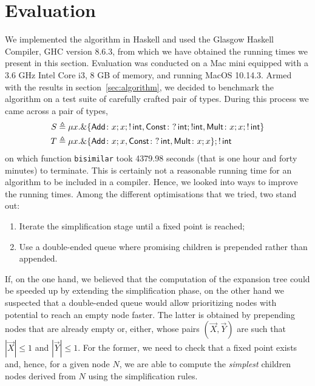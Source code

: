 \section{Evaluation}
\label{sec:evaluation}


We implemented the algorithm
in Haskell and used the Glasgow Haskell Compiler, GHC version 8.6.3,
from which we have obtained the running times we present in this
section.  Evaluation was conducted on a Mac mini equipped with a 3.6
GHz Intel Core i3, 8 GB of memory, and running MacOS 10.14.3.
%
Armed with the results in section~\ref{sec:algorithm}, we decided to
benchmark the algorithm on a test suite of carefully crafted pair of
types. During this process we came across a pair of types,
\begin{equation}
\label{ex:chaotic}
\begin{aligned}
  S &\triangleq \mu x . \&\{ \mathsf{Add}\colon x;x; !\,\mathsf{int},
  \mathsf{Const}\colon ?\,\mathsf{int};!\mathsf{int},
  \mathsf{Mult}\colon x;x;!\,\mathsf{int}\}
  \\
  T &\triangleq \mu x . \&\{ \mathsf{Add}\colon x;x,
  \mathsf{Const}\colon ?\,\mathsf{int},
  \mathsf{Mult}\colon x;x\}; !\,\mathsf{int}
\end{aligned}
\end{equation}
%
on which function \lstinline|bisimilar| took 4379.98 seconds (that is
one hour and forty minutes) to terminate. This is certainly not a
reasonable running time for an algorithm to be included in a
compiler. Hence, we looked into ways to improve the running
times. Among the different optimisations that we tried, two stand
out:
\begin{enumerate}
\item Iterate the simplification stage until a fixed point is reached;
\item Use a double-ended queue where promising children is prepended
  rather than appended.
\end{enumerate}

If, on the one hand, we believed that the computation of the expansion
tree could be speeded up by extending the simplification phase, on the
other hand we suspected that a double-ended queue would allow
prioritizing nodes with potential to reach an empty node faster.  The
latter is obtained by prepending nodes that are already empty or,
either, whose pairs $(\vec X, \vec Y)$ are such that $|\vec X|\leq 1$
and $|\vec Y| \leq 1$.  For the former, we need to check that a fixed
point exists and, hence, for a given node $N$, we are able to compute
the \emph{simplest} children nodes derived from $N$ using the
simplification rules.



